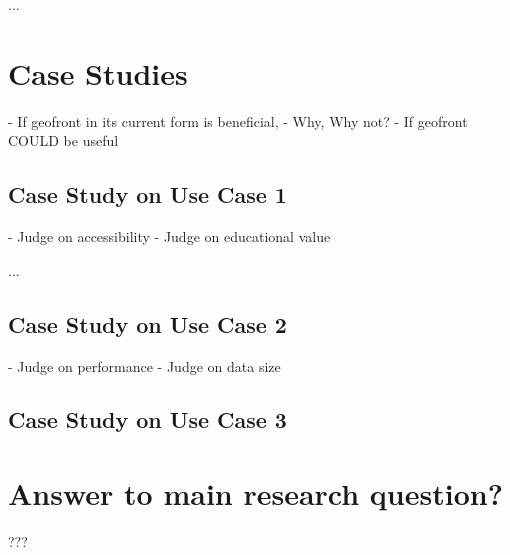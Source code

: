 ...

\section{ Case Studies } 
- If geofront in its current form is beneficial,
  - Why, Why not?
- If geofront COULD be useful

\subsection{Case Study on Use Case 1}%
- Judge on accessibility
- Judge on educational value

...

\subsection{Case Study on Use Case 2}%
- Judge on performance
- Judge on data size



\subsection{Case Study on Use Case 3}%



\section{Answer to main research question?}

???

